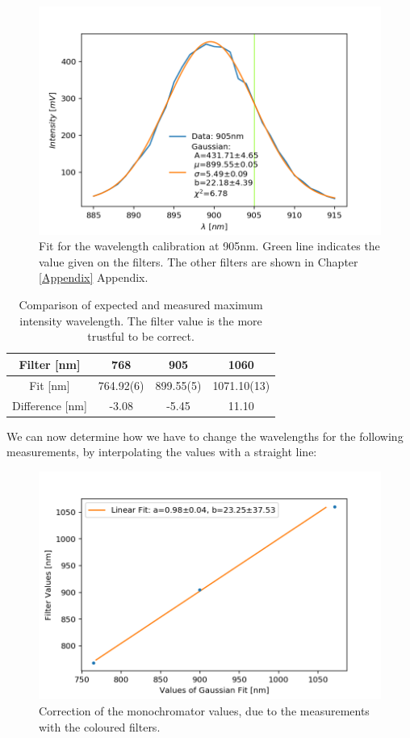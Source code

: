 \documentclass[]{article}
\begin{document}
\begin{figure}[H]
\centering
\includegraphics[width=.9\textwidth]{Plots/905nm-Filter.png}
\caption{Fit for the wavelength calibration at 905nm. Green line indicates the value given on the filters. The other filters are shown in Chapter \ref{Appendix} Appendix.}
\end{figure}

\begin{table}[H]
	\centering
	\begin{tabular}{c|c|c|c}
	Filter [nm] & 768 & 905 & 1060 \\ \hline
	Fit [nm] & 764.92(6) & 899.55(5) & 1071.10(13) \\ \hline
	Difference [nm] & -3.08 & -5.45 & 11.10
	\end{tabular}
	\caption{Comparison of expected and measured maximum intensity wavelength. The filter value is the more trustful to be correct.}
\end{table}

We can now determine how we have to change the wavelengths for the following measurements, by interpolating the values with a straight line:

\begin{figure}[H]
\centering
\includegraphics[width=.9\textwidth]{Plots/LambdaCorrection.png}
\caption{Correction of the monochromator values, due to the measurements with the coloured filters.}
\label{fig:LambdaCorrection}
\end{figure}
\end{document}
